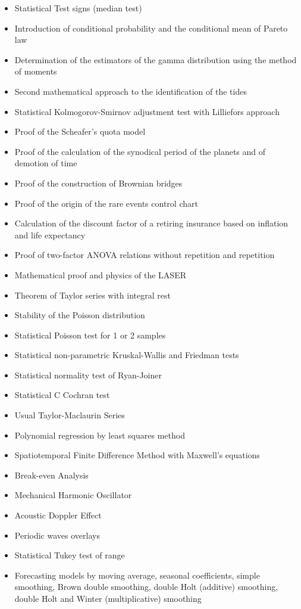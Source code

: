 \documentclass[12pt,a4paper,twoside,openright]{report}
\newcounter{quot}
\theoremstyle{definition}
\theoremstyle{itexmp}
\numberwithin{equation}{section}
\begin{document}
\begin{itemize}
\begin{itemize}[noitemsep]
			\item Statistical Test signs (median test)
			\item Introduction of conditional probability and the conditional mean of Pareto law
			\item Determination of the estimators of the gamma distribution using the method of moments
			\item Second mathematical approach to the identification of the tides
			\item Statistical Kolmogorov-Smirnov adjustment test with Lilliefors approach
			\item Proof of the Scheafer's quota model
			\item Proof of the calculation of the synodical period of the planets and of demotion of time
			\item Proof of the construction of Brownian bridges
			\item Proof of the origin of the rare events control chart
			\item Calculation of the discount factor of a retiring insurance based on inflation and life expectancy
			\item Proof of two-factor ANOVA relations without repetition and repetition
			\item Mathematical proof and physics of the LASER
			\item Theorem of Taylor series with integral rest
			\item Stability of the Poisson distribution
			\item Statistical Poisson test for 1 or 2 samples
			\item Statistical non-parametric Kruskal-Wallis and Friedman tests
			\item Statistical normality test of Ryan-Joiner
			\item Statistical C Cochran test
			\item Usual Taylor-Maclaurin Series
			\item Polynomial regression by least squares method
			\item Spatiotemporal Finite Difference Method with Maxwell's equations
			\item Break-even Analysis
			\item Mechanical Harmonic Oscillator
			\item Acoustic Doppler Effect
			\item Periodic waves overlays
			\item Statistical Tukey test of range
			\item Forecasting models by moving average, seasonal coefficients, simple smoothing, Brown double smoothing, double Holt (additive) smoothing, double Holt and Winter (multiplicative) smoothing

\end{itemize}
\end{itemize}
\end{document}
